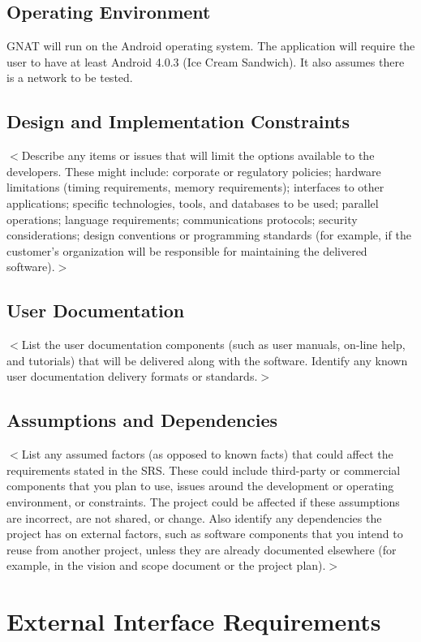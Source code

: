 \documentclass{scrreprt}
\begin{document}
\section{Operating Environment}
GNAT will run on the Android operating system.  The application will require the user to have at least Android 4.0.3 (Ice Cream Sandwich). It also assumes there is a network to be tested.

\section{Design and Implementation Constraints}
$<$Describe any items or issues that will limit the options available to the 
developers. These might include: corporate or regulatory policies; hardware 
limitations (timing requirements, memory requirements); interfaces to other 
applications; specific technologies, tools, and databases to be used; parallel 
operations; language requirements; communications protocols; security 
considerations; design conventions or programming standards (for example, if the 
customer’s organization will be responsible for maintaining the delivered 
software).$>$

\section{User Documentation}
$<$List the user documentation components (such as user manuals, on-line help, 
and tutorials) that will be delivered along with the software. Identify any 
known user documentation delivery formats or standards.$>$
\section{Assumptions and Dependencies}

$<$List any assumed factors (as opposed to known facts) that could affect the 
requirements stated in the SRS. These could include third-party or commercial 
components that you plan to use, issues around the development or operating 
environment, or constraints. The project could be affected if these assumptions 
are incorrect, are not shared, or change. Also identify any dependencies the 
project has on external factors, such as software components that you intend to 
reuse from another project, unless they are already documented elsewhere (for 
example, in the vision and scope document or the project plan).$>$


\chapter{External Interface Requirements}
\end{document}
